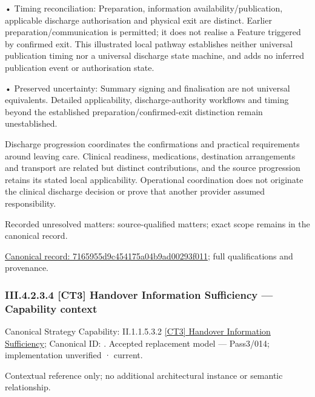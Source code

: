 •
Timing reconciliation: Preparation, information availability/publication, applicable discharge authorisation and physical exit are distinct. Earlier preparation/communication is permitted; it does not realise a Feature triggered by confirmed exit. This illustrated local pathway establishes neither universal publication timing nor a universal discharge state machine, and adds no inferred publication event or authorisation state.



•
Preserved uncertainty: Summary signing and finalisation are not universal equivalents. Detailed applicability, discharge-authority workflows and timing beyond the established preparation/confirmed-exit distinction remain unestablished.



Discharge progression coordinates the confirmations and practical requirements around leaving care. Clinical readiness, medications, destination arrangements and transport are related but distinct contributions, and the source progression retains its stated local applicability. Operational coordination does not originate the clinical discharge decision or prove that another provider assumed responsibility.


{\small Recorded unresolved matters: source-qualified matters; exact scope remains in the canonical record.}\par
{\footnotesize \href{../../../../../../../../continuum/business/business-process/7165955d9c454175a04b9ad00293f011.md}{Canonical record: 7165955d9c454175a04b9ad00293f011}; full qualifications and provenance.}\par
\subsubsection*{III.4.2.3.4 [CT3] Handover Information Sufficiency — Capability context}
\label{navigation:III.4.2.3.4}

{\small Canonical Strategy Capability: II.1.1.5.3.2 \hyperref[element:0028fab3c34d4137a33a0f2e17df0b24]{[CT3] Handover Information Sufficiency}; Canonical ID: \texttt{}. Accepted replacement model — Pass3/014; implementation unverified · current.}\par
Contextual reference only; no additional architectural instance or semantic relationship.\par
